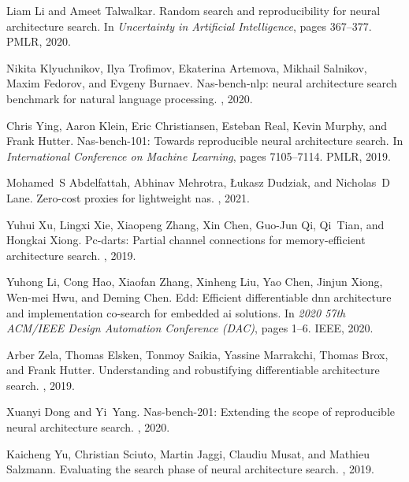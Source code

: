 \documentclass{article}
\begin{document}
\begin{thebibliography}{10}
Liam Li and Ameet Talwalkar.
\newblock Random search and reproducibility for neural architecture search.
\newblock In {\em Uncertainty in Artificial Intelligence}, pages 367--377.
  PMLR, 2020.

Nikita Klyuchnikov, Ilya Trofimov, Ekaterina Artemova, Mikhail Salnikov, Maxim
  Fedorov, and Evgeny Burnaev.
\newblock Nas-bench-nlp: neural architecture search benchmark for natural
  language processing.
, 2020.

Chris Ying, Aaron Klein, Eric Christiansen, Esteban Real, Kevin Murphy, and
  Frank Hutter.
\newblock Nas-bench-101: Towards reproducible neural architecture search.
\newblock In {\em International Conference on Machine Learning}, pages
  7105--7114. PMLR, 2019.

Mohamed~S Abdelfattah, Abhinav Mehrotra, {\L}ukasz Dudziak, and Nicholas~D
  Lane.
\newblock Zero-cost proxies for lightweight nas.
, 2021.

Yuhui Xu, Lingxi Xie, Xiaopeng Zhang, Xin Chen, Guo-Jun Qi, Qi~Tian, and
  Hongkai Xiong.
\newblock Pc-darts: Partial channel connections for memory-efficient
  architecture search.
, 2019.

Yuhong Li, Cong Hao, Xiaofan Zhang, Xinheng Liu, Yao Chen, Jinjun Xiong,
  Wen-mei Hwu, and Deming Chen.
\newblock Edd: Efficient differentiable dnn architecture and implementation
  co-search for embedded ai solutions.
\newblock In {\em 2020 57th ACM/IEEE Design Automation Conference (DAC)}, pages
  1--6. IEEE, 2020.

Arber Zela, Thomas Elsken, Tonmoy Saikia, Yassine Marrakchi, Thomas Brox, and
  Frank Hutter.
\newblock Understanding and robustifying differentiable architecture search.
, 2019.

Xuanyi Dong and Yi~Yang.
\newblock Nas-bench-201: Extending the scope of reproducible neural
  architecture search.
, 2020.

Kaicheng Yu, Christian Sciuto, Martin Jaggi, Claudiu Musat, and Mathieu
  Salzmann.
\newblock Evaluating the search phase of neural architecture search.
, 2019.


\end{thebibliography}
\end{document}
